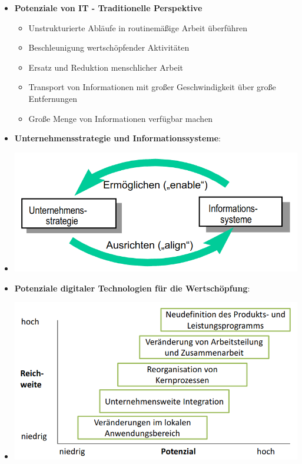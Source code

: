 \documentclass[12pt,a4paper]{article}
\begin{document}
\begin{itemize}
   \item \textbf{Potenziale von IT - Traditionelle Perspektive}
      \begin{itemize}
			\item Unstrukturierte Abläufe in routinemäßige Arbeit überführen
			\item Beschleunigung wertschöpfender Aktivitäten
			\item Ersatz und Reduktion menschlicher Arbeit
			\item Transport von Informationen mit großer Geschwindigkeit über große Entfernungen
			\item Große Menge von Informationen verfügbar machen
      \end{itemize}

   \item \textbf{Unternehmensstrategie und Informationssysteme}:
   \item[] \includegraphics[scale=0.45]{UIS.png}
   
   \item \textbf{Potenziale digitaler Technologien für die Wertschöpfung}:
   \item[] \includegraphics[scale=0.5]{Potenziale.png}
   

\end{itemize}
\end{document}
